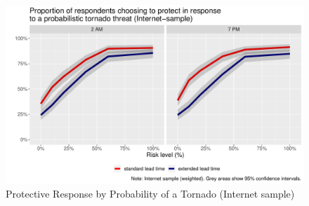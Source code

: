 \documentclass{ametsocV6.1}
\begin{document}
\begin{figure}[!htbp]
\centering
\includegraphics[width=33pc]{../Graphs/threat_resp_allQ.pdf} 
\caption{Protective Response by Probability of a Tornado (Internet sample)}\label{threat_respQ}
\end{figure}

\clearpage
\newpage


\end{document}
